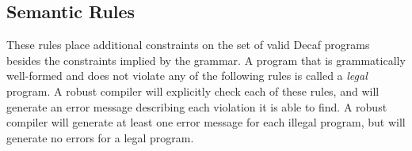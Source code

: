

\subsection*{Semantic Rules}

These rules place additional constraints on the set of valid
Decaf programs besides the constraints implied by the
grammar.  A program that is grammatically well-formed and does not
violate any of the following rules is called a \textit{legal} program.
A robust compiler will explicitly check each of these rules, and will
generate an error message describing each violation it is able to
find.  A robust compiler will generate at least one error message for
each illegal program, but will generate no errors for a legal program.

